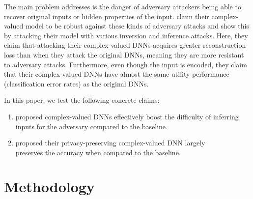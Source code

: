 
The main problem \citet{xiang2020interpretable} addresses is the danger of adversary attackers being able to recover original inputs or hidden properties of the input. 
\citet{xiang2020interpretable} claim their complex-valued model to be robust against these kinds of adversary attacks and show this by attacking their model with various inversion and inference attacks. Here, they claim that attacking their complex-valued DNNs acquires greater reconstruction loss than when they attack the original DNNs, meaning they are more resistant to adversary attacks. Furthermore, even though the input is encoded, they claim that their complex-valued DNNs have almost the same utility performance (classification error rates) as the original DNNs. 

In this paper, we test the following concrete claims:
\begin{enumerate}[ wide = 0pt, leftmargin = *]
    \item \citet{xiang2020interpretable} proposed complex-valued DNNs effectively boost the difficulty of inferring inputs for the adversary compared to the baseline. \label{claim1}
    \item \citet{xiang2020interpretable} proposed their privacy-preserving complex-valued DNN largely \\ preserves the accuracy when compared to the baseline. \label{claim2}
\end{enumerate}



\section{Methodology}

